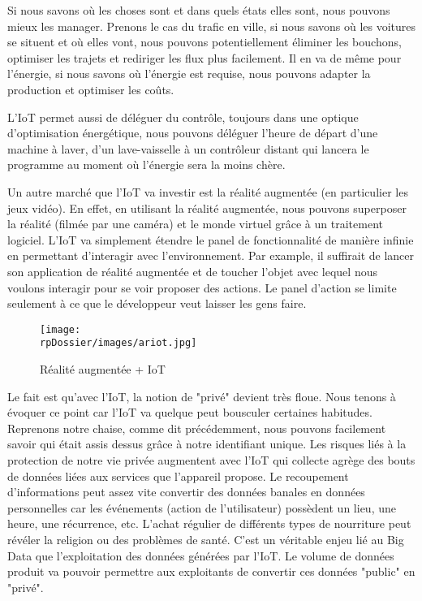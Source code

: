 
Si nous savons où les choses sont et dans quels états elles sont, nous pouvons mieux les manager. Prenons le cas du trafic en ville, si nous savons où les voitures se situent et où elles vont, nous pouvons potentiellement éliminer les bouchons, optimiser les trajets et rediriger les flux plus facilement. Il en va de même pour l'énergie, si nous savons où l'énergie est requise, nous pouvons adapter la production et optimiser les coûts.


L'IoT permet aussi de déléguer du contrôle, toujours dans une optique d'optimisation énergétique, nous pouvons déléguer l'heure de départ d'une machine à laver, d'un lave-vaisselle à un contrôleur distant qui lancera le programme au moment où l'énergie sera la moins chère.


Un autre marché que l'IoT va investir est la réalité augmentée (en particulier les jeux vidéo). En effet, en utilisant la réalité augmentée, nous pouvons superposer la réalité (filmée par une caméra) et le monde virtuel grâce à un traitement logiciel. L'IoT va simplement étendre le panel de fonctionnalité de manière infinie en permettant d'interagir avec l'environnement. Par example, il suffirait de lancer son application de réalité augmentée et de toucher l'objet avec lequel nous voulons interagir pour se voir proposer des actions. Le panel d'action se limite seulement à ce que le développeur veut laisser les gens faire.

\begin{figure}[H]
\begin{center}
\texttt{[image: \\rpDossier/images/ariot.jpg]}
\end{center}
\caption{Réalité augmentée + IoT}
\label{ariot}
\end{figure}


Le fait est qu'avec l'IoT, la notion de "privé" devient très floue. Nous tenons à évoquer ce point car l'IoT va quelque peut bousculer certaines habitudes. Reprenons notre chaise, comme dit précédemment, nous pouvons facilement savoir qui était assis dessus grâce à notre identifiant unique. Les risques liés à la protection de notre vie privée augmentent avec l'IoT qui collecte agrège des bouts de données liées aux services que l'appareil propose. Le recoupement d'informations peut assez vite convertir des données banales en données personnelles car les événements (action de l'utilisateur) possèdent un lieu, une heure, une récurrence, etc. L'achat régulier de différents types de nourriture peut révéler la religion ou des problèmes de santé. C'est un véritable enjeu lié au Big Data que l'exploitation des données générées par l'IoT. Le volume de données produit va pouvoir permettre aux exploitants de convertir ces données "public" en "privé".

